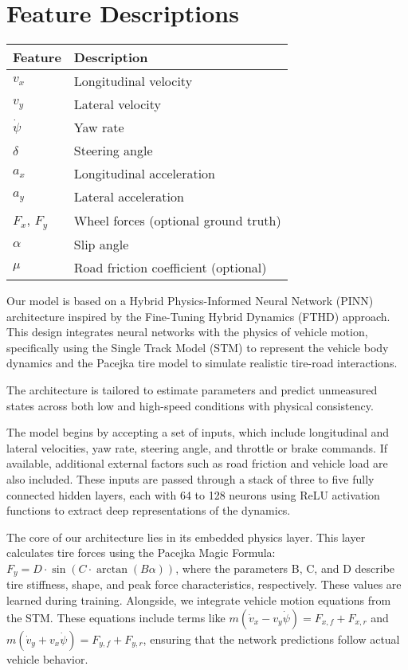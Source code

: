 \documentclass{article}
\begin{document}
\section*{Feature Descriptions}

\begin{tabular}{|l|l|}
\hline
\textbf{Feature} & \textbf{Description} \\
\hline
$v_x$ & Longitudinal velocity \\
$v_y$ & Lateral velocity \\
$\dot{\psi}$ & Yaw rate \\
$\delta$ & Steering angle \\
$a_x$ & Longitudinal acceleration \\
$a_y$ & Lateral acceleration \\
$F_x$, $F_y$ & Wheel forces (optional ground truth) \\
$\alpha$ & Slip angle \\
$\mu$ & Road friction coefficient (optional) \\
\hline
\end{tabular}


Our model is based on a Hybrid Physics-Informed Neural Network (PINN) architecture inspired by the Fine-Tuning Hybrid Dynamics (FTHD) approach. This design integrates neural networks with the physics of vehicle motion, specifically using the Single Track Model (STM) to represent the vehicle body dynamics and the Pacejka tire model to simulate realistic tire-road interactions.

The architecture is tailored to estimate parameters and predict unmeasured states across both low and high-speed conditions with physical consistency.

The model begins by accepting a set of inputs, which include longitudinal and lateral velocities, yaw rate, steering angle, and throttle or brake commands. If available, additional external factors such as road friction and vehicle load are also included. These inputs are passed through a stack of three to five fully connected hidden layers, each with 64 to 128 neurons using ReLU activation functions to extract deep representations of the dynamics.

The core of our architecture lies in its embedded physics layer. This layer calculates tire forces using the Pacejka Magic Formula: $F_y = D\cdot\sin(C\cdot\arctan(B\alpha))$, where the parameters B, C, and D describe tire stiffness, shape, and peak force characteristics, respectively. These values are learned during training. Alongside, we integrate vehicle motion equations from the STM. These equations include terms like $m(\dot{v}_x - v_y\dot{\psi}) = F_{x,f} + F_{x,r}$ and $m(\dot{v}_y + v_x\dot{\psi}) = F_{y,f} + F_{y,r}$, ensuring that the network predictions follow actual vehicle behavior.
\end{document}
